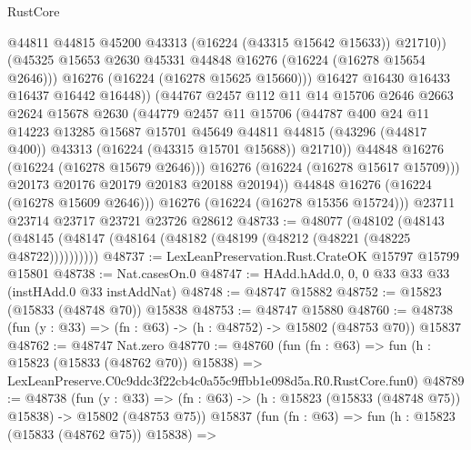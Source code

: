 \begin{lexlean}{RustCore}
\begin{coremodule}
                        @44811
                        @44815
                        @45200
                        @43313
                        (@16224 (@43315 @15642 @15633))
                        @21710))
                    (@45325 @15653 @2630 @45331 @44848 @16276 (@16224 (@16278 @15654 @2646)))
                    @16276
                    (@16224 (@16278 @15625 @15660)))
                  @16427
                  @16430
                  @16433
                  @16437
                  @16442
                  @16448))
              (@44767
                @2457
                @112
                @11
                @14
                @15706
                @2646
                @2663
                @2624
                @15678
                @2630
                (@44779
                  @2457
                  @11
                  @15706
                  (@44787
                    @400
                    @24
                    @11
                    @14223
                    @13285
                    @15687
                    @15701
                    @45649
                    @44811
                    @44815
                    (@43296 (@44817 @400))
                    @43313
                    (@16224 (@43315 @15701 @15688))
                    @21710))
                @44848
                @16276
                (@16224 (@16278 @15679 @2646)))
              @16276
              (@16224 (@16278 @15617 @15709)))
            @20173
            @20176
            @20179
            @20183
            @20188
            @20194))
        @44848
        @16276
        (@16224 (@16278 @15609 @2646)))
      @16276
      (@16224 (@16278 @15356 @15724)))
    @23711
    @23714
    @23717
    @23721
    @23726
    @28612
@48733 := @48077
    (@48102 (@48143 (@48145 (@48147 (@48164 (@48182 (@48199 (@48212 (@48221 (@48225 @48722))))))))))
@48737 := LexLeanPreservation.Rust.CrateOK @15797 @15799 @15801
@48738 := Nat.casesOn.{0}
@48747 := HAdd.hAdd.{0, 0, 0} @33 @33 @33 (instHAdd.{0} @33 instAddNat)
@48748 := @48747 @15882
@48752 := @15823 (@15833 (@48748 @70)) @15838
@48753 := @48747 @15880
@48760 := @48738 (fun (y : @33) => (fn : @63) -> (h : @48752) -> @15802 (@48753 @70)) @15837
@48762 := @48747 Nat.zero
@48770 := @48760
    (fun (fn : @63) =>
    fun (h : @15823 (@15833 (@48762 @70)) @15838) =>
    LexLeanPreserve.C0c9ddc3f22cb4c0a55c9ffbb1e098d5a.R0.RustCore.fun0)
@48789 := @48738
    (fun (y : @33) =>
    (fn : @63) -> (h : @15823 (@15833 (@48748 @75)) @15838) -> @15802 (@48753 @75))
    @15837
    (fun (fn : @63) =>
    fun (h : @15823 (@15833 (@48762 @75)) @15838) =>

\end{coremodule}
\end{lexlean}
